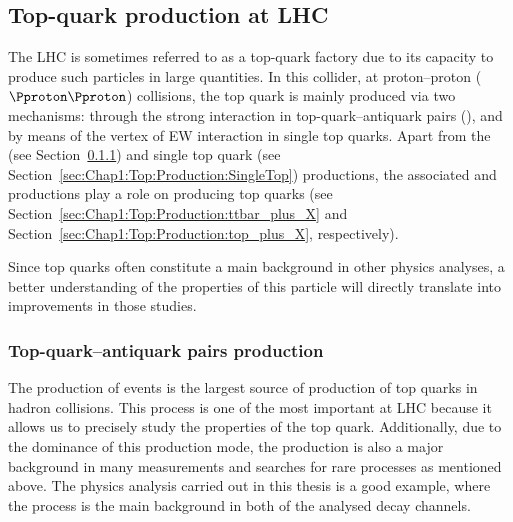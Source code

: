 



\subsection{Top-quark production at LHC}
\label{sec:Chap1:Top:Production}
The LHC is sometimes referred to as a top-quark factory due to its capacity to produce such particles in large quantities. 
In this collider, at proton--proton ($\Pproton\Pproton$) collisions, the top quark is mainly produced via
two mechanisms: through the strong interaction in top-quark--antiquark pairs (\ttbar), and by means of the \Wtb 
vertex of EW interaction in single top quarks. %
 Apart from the \ttbar (see Section~\ref{sec:Chap1:Top:Production:TopPairs}) and single top quark
(see Section~\ref{sec:Chap1:Top:Production:SingleTop}) productions, the associated \ttX and \tX 
productions play a role on producing top quarks (see Section~\ref{sec:Chap1:Top:Production:ttbar_plus_X} and 
Section~\ref{sec:Chap1:Top:Production:top_plus_X}, respectively).

Since top quarks often constitute a main background in other physics analyses, 
a better understanding of the properties of this particle will directly translate into improvements 
in those studies.

\subsubsection{Top-quark--antiquark pairs production}
\label{sec:Chap1:Top:Production:TopPairs}
The production of \ttbar events is the largest source of production of top quarks in hadron collisions. This
process is one of the most important at LHC because it allows us to precisely study the properties of the top quark. 
Additionally, due to the dominance of this production mode, the \ttbar production is also a major background 
in many measurements and searches for rare processes as mentioned above. 
The physics analysis carried out in this thesis is a good example, 
where the \ttbar process is the main background in
both of the analysed decay channels.

